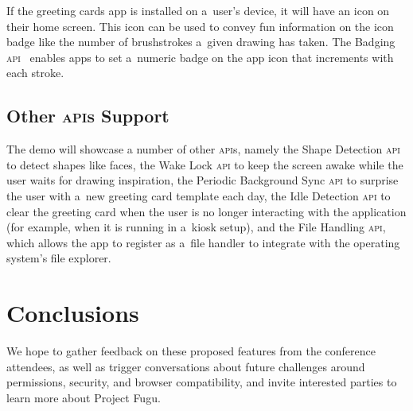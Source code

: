 \documentclass[sigconf]{acmart}
\begin{document}
If the greeting cards app is installed on a~user's device,
it will have an icon on their home screen.
This icon can be used to convey fun information on the icon badge
like the number of brushstrokes a~given drawing has taken.
The Badging \textsc{api}~\cite{giuca19} enables apps to set a~numeric badge on the app icon
that increments with each stroke.

\subsection{Other \textsc{api}s Support}

The demo will showcase a number of other \textsc{api}s, namely the
Shape Detection \textsc{api} to detect shapes like faces,
the Wake Lock  \textsc{api} to keep the screen awake
while the user waits for drawing inspiration, 
the Periodic Background Sync  \textsc{api} to surprise the user
with a~new greeting card template each day,
the Idle Detection \textsc{api} to clear the greeting card
when the user is no longer interacting with the application
(for example, when it is running in a~kiosk setup),
and the File Handling \textsc{api}, which allows the app
to register as a~file handler to integrate with the operating system's file explorer.

\section{Conclusions}

We hope to gather feedback on these proposed features from the conference attendees,
as well as trigger conversations about future challenges around
permissions, security, and browser compatibility,
and invite interested parties to learn more about Project Fugu.



\end{document}
